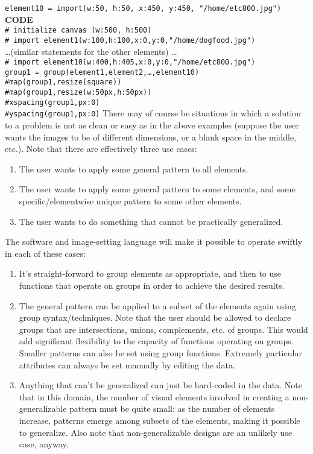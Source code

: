 \documentclass[12pt]{article}
\theoremstyle{remark}
\newcommand{\ttt}[1]{\texttt{#1}}
\begin{document}
\begin{section}
\ttt{element10 = import(w:50, h:50, x:450, y:450, "/home/etc800.jpg")}\\
\textbf{CODE}\\
\ttt{\# initialize canvas (w:500, h:500)}\\
\ttt{\# import element1(w:100,h:100,x:0,y:0,"/home/dogfood.jpg")}\\
\ldots (similar statements for the other elements) \ldots\\
\ttt{\# import element10(w:400,h:405,x:0,y:0,"/home/etc800.jpg")}\\
\ttt{group1 = group(element1,element2,\ldots,element10)}\\
\ttt{\#map(group1,resize(square))}\\
\ttt{\#map(group1,resize(w:50px,h:50px))}\\
\ttt{\#xspacing(group1,px:0)}\\
\ttt{\#yspacing(group1,px:0)}
\newpage
\noindent
There may of course be situations in which a solution to a problem is not as clean or easy as in the above examples (suppose the user wants the images to be of different dimensions, or a blank space in the middle, etc.). Note that there are effectively three use cases:
\begin{enumerate}
\item The user wants to apply some general pattern to all elements.
\item The user wants to apply some general pattern to some elements, and some specific/elementwise unique pattern to some other elements.
\item The user wants to do something that cannot be practically generalized.
\end{enumerate}
The software and image-setting language will make it possible to operate swiftly in each of these cases:
\begin{enumerate}
\item It's straight-forward to group elements as appropriate, and then to use functions that operate on groups in order to achieve the desired results.
\item The general pattern can be applied to a subset of the elements again using group syntax/techniques. Note that the user should be allowed to declare groups that are intersections, unions, complements, etc. of groups. This would add significant flexibility to the capacity of functions operating on groups. Smaller patterns can also be set using group functions. Extremely particular attributes can always be set manually by editing the data.
\item Anything that can't be generalized can just be hard-coded in the data. Note that in this domain, the number of visual elements involved in creating a non-generalizable pattern must be quite small: as the number of elements increase, patterns emerge among subsets of the elements, making it possible to generalize. Also note that non-generalizable designs are an unlikely use case, anyway. 
\end{enumerate}

\end{section}
\end{document}
